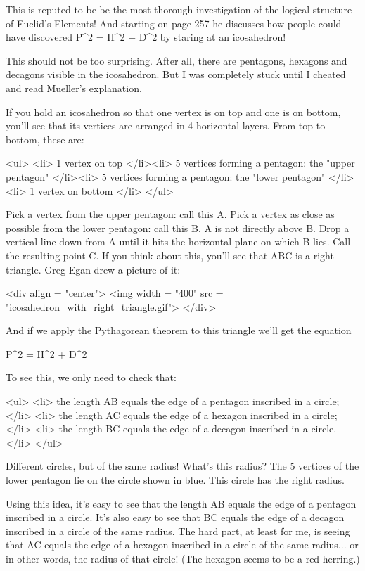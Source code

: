 This is reputed to be be the most thorough investigation of the 
logical structure of Euclid's Elements!  And starting on page 257 he
discusses how people could have discovered P^{2} = 
H^{2} + D^{2} by staring at
an icosahedron!  

This should not be too surprising.  After all, there are pentagons, 
hexagons and decagons visible in the icosahedron.  But I was completely
stuck until I cheated and read Mueller's explanation.

If you hold an icosahedron so that one vertex is on top and one is
on bottom, you'll see that its vertices are arranged in 4 horizontal
layers.  From top to bottom, these are:

<ul>
<li>
1 vertex on top
</li><li>
5 vertices forming a pentagon: the "upper pentagon"
</li><li>
5 vertices forming a pentagon: the "lower pentagon"
</li><li>
1 vertex on bottom
</li>
</ul>

Pick a vertex from the upper pentagon: call this A.  Pick a vertex 
as close as possible from the lower pentagon: call this B.  A is not 
directly above B.  Drop a vertical line down from A until it hits the 
horizontal plane on which B lies.  Call the resulting point C.  
If you think about this, you'll see that ABC is a right triangle.  
Greg Egan drew a picture of it:

<div align = "center">
<img width = "400" src = "icosahedron_with_right_triangle.gif">
</div>

And if we apply the Pythagorean theorem to 
this triangle we'll get the equation

P^{2} = H^{2} + D^{2}

To see this, we only need to check that:

<ul>
<li>
the length AB equals the edge of a pentagon inscribed in a circle;
</li>
<li>
the length AC equals the edge of a hexagon inscribed in a circle;
</li>
<li>
the length BC equals the edge of a decagon inscribed in a circle.
</li>
</ul>

Different circles, but of the same radius!  What's this radius?  The 5
vertices of the lower pentagon lie on the circle shown in
blue.  This circle has the right radius.

Using this idea, it's easy to see that the length AB equals the edge
of a pentagon inscribed in a circle.  It's also easy to see that 
BC equals the edge of a decagon inscribed in a circle of the same
radius.  The hard part, at least for me, is seeing that AC equals the 
edge of a hexagon inscribed in a circle of the same radius... or in 
other words, the radius of that circle!  (The hexagon seems to be a
red herring.)


